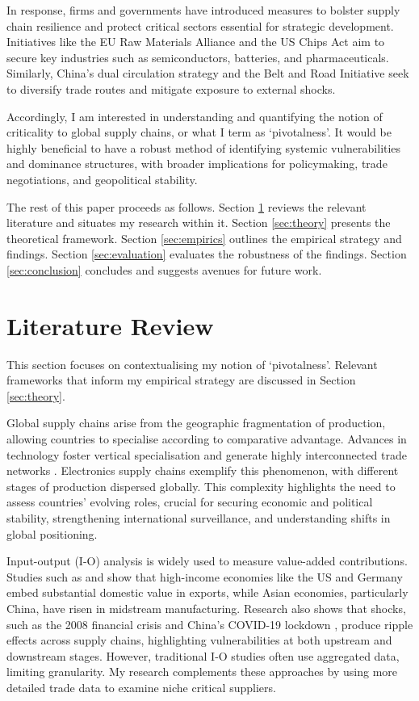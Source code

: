 \documentclass[11pt]{article}
\begin{document}
In response, firms and governments have introduced measures to bolster supply chain resilience and protect critical sectors essential for strategic development. Initiatives like the EU Raw Materials Alliance and the US Chips Act aim to secure key industries such as semiconductors, batteries, and pharmaceuticals. Similarly, China’s dual circulation strategy and the Belt and Road Initiative seek to diversify trade routes and mitigate exposure to external shocks.

Accordingly, I am interested in understanding and quantifying the notion of criticality to global supply chains, or what I term as `pivotalness'. It would be highly beneficial to have a robust method of identifying systemic vulnerabilities and dominance structures, with broader implications for policymaking, trade negotiations, and geopolitical stability.

The rest of this paper proceeds as follows. Section \ref{sec:litreview} reviews the relevant literature and situates my research within it. Section \ref{sec:theory} presents the theoretical framework. Section \ref{sec:empirics} outlines the empirical strategy and findings. Section \ref{sec:evaluation} evaluates the robustness of the findings. Section \ref{sec:conclusion} concludes and suggests avenues for future work.

\section{Literature Review}
\label{sec:litreview}

This section focuses on contextualising my notion of `pivotalness'. Relevant frameworks that inform my empirical strategy are discussed in Section \ref{sec:theory}.

Global supply chains arise from the geographic fragmentation of production, allowing countries to specialise according to comparative advantage. Advances in technology foster vertical specialisation \citep{hummels1999} and generate highly interconnected trade networks \citep{baldwin2016}. Electronics supply chains exemplify this phenomenon, with different stages of production dispersed globally. This complexity highlights the need to assess countries’ evolving roles, crucial for securing economic and political stability, strengthening international surveillance, and understanding shifts in global positioning.

Input-output (I-O) analysis is widely used to measure value-added contributions. Studies such as \citet{koopman2014} and \citet{timmer2014} show that high-income economies like the US and Germany embed substantial domestic value in exports, while Asian economies, particularly China, have risen in midstream manufacturing. Research also shows that shocks, such as the 2008 financial crisis \citep{baldwin2009} and China's COVID-19 lockdown \citep{lafrogne2022}, produce ripple effects across supply chains, highlighting vulnerabilities at both upstream and downstream stages. However, traditional I-O studies often use aggregated data, limiting granularity. My research complements these approaches by using more detailed trade data to examine niche critical suppliers.
\end{document}
